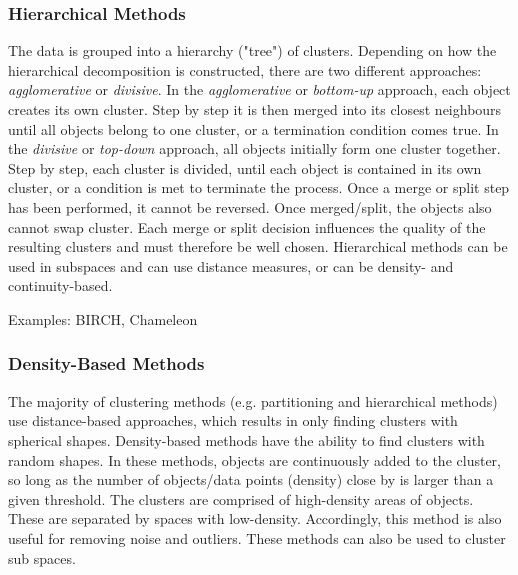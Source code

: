   \subsubsection{Hierarchical Methods}
  The data is grouped into a hierarchy ("tree") of clusters. Depending on how the hierarchical decomposition is constructed, there are two different approaches: \textit{agglomerative} or \textit{divisive}. In the \textit{agglomerative} or \textit{bottom-up} approach, each object creates its own cluster. Step by step it is then merged into its closest neighbours until all objects belong to one cluster, or a termination condition comes true. In the \textit{divisive} or \textit{top-down} approach, all objects initially form one cluster together. Step by step, each cluster is divided, until each object is contained in its own cluster, or a condition is met to terminate the process. Once a merge or split step has been performed, it cannot be reversed. Once merged/split, the objects also cannot swap cluster. Each merge or split decision influences the quality of the resulting clusters and must therefore be well chosen. Hierarchical methods can be used in subspaces and can use distance measures, or can be density- and continuity-based.


  Examples: BIRCH, Chameleon
  

  \subsubsection{Density-Based Methods}
  The majority of clustering methods (e.g. partitioning and hierarchical methods) use distance-based approaches, which results in only finding clusters with spherical shapes. Density-based methods have the ability to find clusters with random shapes. In these methods, objects are continuously added to the cluster, so long as the number of objects/data points (density) close by is larger than a given threshold. The clusters are comprised of high-density areas of objects. These are separated by spaces with low-density. Accordingly, this method is also useful for removing noise and outliers.
  These methods can also be used to cluster sub spaces.


